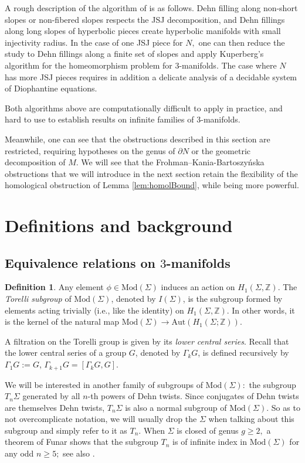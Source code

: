 \documentclass[12pt]{amsart}
\theoremstyle{definition}
\newtheorem{dfn}[thm]{Definition}
\newcommand{\ra}{\rightarrow}
\newcommand{\Z}{\mathbb{Z}}
\begin{document}
A rough description of the algorithm of \cite{Sch25} is as follows. Dehn filling along non-short slopes or non-fibered slopes respects the JSJ decomposition, and Dehn fillings along long slopes of hyperbolic pieces create hyperbolic manifolds with small injectivity radius. In the case of one JSJ piece for $N,$ one can then reduce the study to Dehn fillings along a finite set of slopes and apply Kuperberg's algorithm \cite{Kup19} for the homeomorphism problem for $3$-manifolds. The case where $N$ has more JSJ pieces requires in addition a delicate analysis of a decidable system of Diophantine equations.  


Both algorithms above are computationally difficult to apply in practice, and hard to use to establish results on infinite families of $3$-manifolds.

Meanwhile, one can see that the obstructions described in this section are restricted, requiring hypotheses on the genus of $\partial N$ or the geometric decomposition of $M.$ We will see that the Frohman--Kania-Bartoszy\'nska obstructions that we will introduce in the next section retain the flexibility of the homological obstruction of Lemma \ref{lem:homolBound}, while being more powerful.



\section{Definitions and background}
\label{sec:definitons}
\subsection{Equivalence relations on $3$-manifolds}
\label{sec:equivRel}
\begin{dfn}
	Any element $\phi\in \mathrm{Mod}(\Sigma)$ induces an action on $H_1(\Sigma,\Z)$. The \emph{Torelli subgroup} of $\mathrm{Mod}(\Sigma)$, denoted by $I(\Sigma)$, is the subgroup formed by elements acting trivially (i.e., like the identity) on $H_1(\Sigma,\Z)$. In other words, it is the kernel of the natural map $\mathrm{Mod}(\Sigma)\ra \textrm{Aut}(H_1(\Sigma;\Z))$.
\end{dfn}

A filtration on the Torelli group is given by its \emph{lower central series}. Recall that the lower central series of a group $G$, denoted by $\Gamma_{k}G$, is defined recursively by $\Gamma_1 G:= G$, $\Gamma_{k+1}G=[\Gamma_k G,G]$. 

We will be interested in another family of subgroups of $\mathrm{Mod}(\Sigma):$ the subgroup $T_n\Sigma$ generated by all $n$-th powers of Dehn twists. Since conjugates of Dehn twists are themselves Dehn twists, $T_n\Sigma$ is also a normal subgroup of $\mathrm{Mod}(\Sigma).$ So as to not overcomplicate notation, we will usually drop the $\Sigma$ when talking about this subgroup and simply refer to it as $T_n$. When $\Sigma$ is closed of genus $g\geq 2,$ a theorem of Funar \cite{Fun99} shows that the subgroup $T_n$ is of infinite index in $\mathrm{Mod}(\Sigma)$ for any odd $n\geq 5;$ see also \cite{Mas98}.
\end{document}
